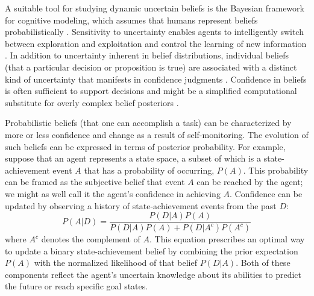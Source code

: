 A suitable tool for studying dynamic uncertain beliefs is the Bayesian framework for cognitive modeling, which assumes that humans represent beliefs probabilistically \cite{sun_bayesian_2008,perfors_tutorial_2011,coenen_asking_2019}. Sensitivity to uncertainty enables agents to intelligently switch between exploration and exploitation \cite{cohen_should_2007} and control the learning of new information \cite{meyniel_confidence_2015}. In addition to uncertainty inherent in belief distributions, individual beliefs (that a particular decision or proposition is true) are associated with a distinct kind of uncertainty that manifests in confidence judgments \cite{pouget_confidence_2016}. Confidence in beliefs is often sufficient to support decisions and might be a simplified computational substitute for overly complex belief posteriors \cite{pouget_confidence_2016}.  

Probabilistic beliefs (that one can accomplish a task) can be characterized by more or less confidence and change as a result of self-monitoring. The evolution of such beliefs can be expressed in terms of posterior probability. For example, suppose that an agent represents a state space, a subset of which is a state-achievement event $A$ that has a probability of occurring, $P(A)$. This probability can be framed as the subjective belief that event $A$ can be reached by the agent; we might as well call it the agent's confidence in achieving $A$. Confidence can be updated by observing a history of state-achievement events from the past $D$:
\begin{equation}
    P(A|D) = \frac{P(D|A) P(A)}{P(D|A)P(A) + P(D|A^c)P(A^c)}
\end{equation}
where $A^c$ denotes the complement of $A$. This equation prescribes an optimal way to update a binary state-achievement belief by combining the prior expectation $P(A)$ with the normalized likelihood of that belief $P(D|A)$. Both of these components reflect the agent's uncertain knowledge about its abilities to predict the future or reach specific goal states.

